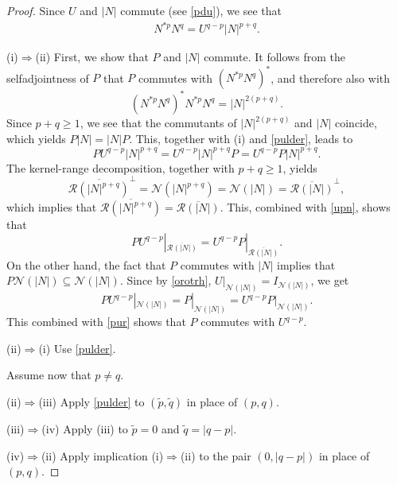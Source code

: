 \documentclass[reqno]{amsproc}
\numberwithin{equation}{section}
\theoremstyle{remark}
\newcommand*{\nul}{\mathscr{N}}
\theoremstyle{definition}
\newcommand*{\Ge}{\geqslant}
\newcommand*{\ran}{\mathscr{R}}
\begin{document}
   \begin{proof}
Since $U$ and $|N|$ commute (see
\eqref{pdu}), we see that
   \begin{align} \label{pulder}
N^{*p}N^q=U^{q-p}|N|^{p+q}.
   \end{align}

(i)$\Rightarrow$(ii) First, we show that $P$ and $|N|$
commute. It follows from the selfadjointness of $P$
that $P$ commutes with $(N^{*p}N^q)^*$, and therefore
also with
   \begin{equation*}
(N^{*p}N^q)^*N^{*p}N^q=|N|^{2(p+q)}.
   \end{equation*}
Since $p+q \Ge 1$, we see that the commutants of
$|N|^{2(p+q)}$ and $|N|$ coincide, which yields
$P|N|=|N|P$. This, together with (i) and
\eqref{pulder}, leads to
   \begin{equation} \label{upn}
PU^{q-p}|N|^{p+q}=U^{q-p}|N|^{p+q}P=U^{q-p}P|N|^{p+q}.
   \end{equation}
The kernel-range decomposition, together with $p+q \Ge
1$, yields
   \begin{equation*}
\overline{\ran(|N|^{p+q})}^\perp =
\nul(|N|^{p+q})=\nul(|N|) =
\overline{\ran(|N|)}^\perp,
   \end{equation*}
which implies that
$\overline{\ran(|N|^{p+q})} =
\overline{\ran(|N|)}$. This, combined with
\eqref{upn}, shows that
   \begin{equation}\label{pur}
PU^{q-p}|_{\overline{\ran(|N|)}}=U^{q-p}P|_{\overline{\ran(|N|)}}.
   \end{equation}
On the other hand, the fact that $P$
commutes with $|N|$ implies that
$P\nul(|N|)\subseteq \nul(|N|)$. Since by
\eqref{orotrh},
$U|_{{\nul(|N|)}}=I_{{\nul(|N|)}}$, we get
   \begin{equation*}
PU^{q-p}|_{{\nul(|N|)}}=P|_{{\nul(|N|)}}=U^{q-p}P|_{{\nul(|N|)}}.
   \end{equation*}
This combined with \eqref{pur} shows that
$P$ commutes with $U^{q-p}$.

(ii)$\Rightarrow$(i) Use \eqref{pulder}.

Assume now that $p\neq q$.

(ii)$\Rightarrow$(iii) Apply \eqref{pulder} to
$(\tilde p, \tilde q)$ in place of $(p,q)$.

(iii)$\Rightarrow$(iv) Apply (iii) to
$\tilde p= 0$ and $\tilde q=|q-p|$.

(iv)$\Rightarrow$(ii) Apply implication
(i)$\Rightarrow$(ii) to the pair $(0,|q-p|)$
in place of $(p,q)$.
   \end{proof}
\end{document}

